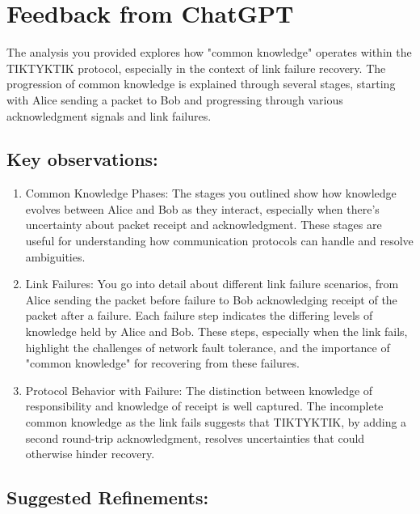 \documentclass[../HFT-main.tex]{subfiles}
\begin{document}

\newpage
\section{Feedback from ChatGPT}

The analysis you provided explores how "common knowledge" operates within the TIKTYKTIK protocol, especially in the context of link failure recovery. The progression of common knowledge is explained through several stages, starting with Alice sending a packet to Bob and progressing through various acknowledgment signals and link failures.

\subsection{Key observations:}

\begin{enumerate}
\item Common Knowledge Phases: The stages you outlined show how knowledge evolves between Alice and Bob as they interact, especially when there’s uncertainty about packet receipt and acknowledgment. These stages are useful for understanding how communication protocols can handle and resolve ambiguities.

\item Link Failures: You go into detail about different link failure scenarios, from Alice sending the packet before failure to Bob acknowledging receipt of the packet after a failure. Each failure step indicates the differing levels of knowledge held by Alice and Bob. These steps, especially when the link fails, highlight the challenges of network fault tolerance, and the importance of "common knowledge" for recovering from these failures.

\item Protocol Behavior with Failure: The distinction between knowledge of responsibility and knowledge of receipt is well captured. The incomplete common knowledge as the link fails suggests that TIKTYKTIK, by adding a second round-trip acknowledgment, resolves uncertainties that could otherwise hinder recovery.

\end{enumerate}

\subsection{Suggested Refinements:}
\end{document}
